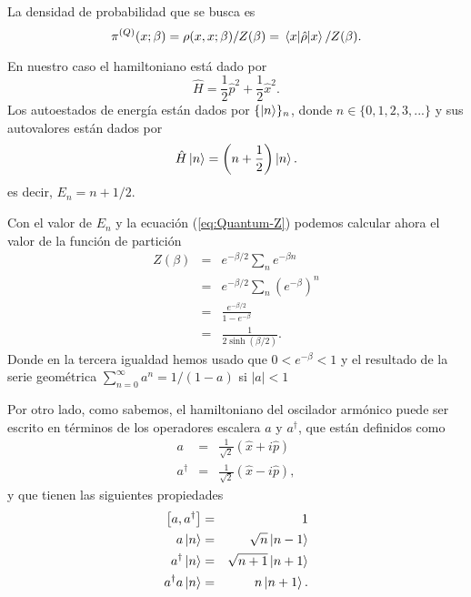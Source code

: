 \documentclass[%
 reprint,
 amsmath,amssymb,
 aps,
 pra,
]{revtex4-2}
\begin{document}
La densidad de probabilidad que se busca es
\begin{equation}
\pi^{(Q)}(x;\beta) = \rho(x,x;\beta)/Z(\beta) = \ev{\hat{\rho}}{x}/Z(\beta). \label{eq:Quantum-pi}
\end{equation}

En nuestro caso el hamiltoniano está dado por
\begin{equation}
\hat{H} = \frac{1}{2} \hat{p}^2 + \frac{1}{2} \hat{x}^2. \label{eq:Quantum-Hamiltonian}
\end{equation}
Los autoestados de energía están dados por $\{\ket{n}\}_n$, donde $n\in\{0,1,2,3,...\}$ y sus autovalores están dados por 
\begin{equation}
\hat{H}\ket{n} = \left(n+\frac{1}{2}\right)\ket{n}.
\end{equation}
es decir, $E_n = n+1/2$.

Con el valor de $E_n$ y la ecuación (\ref{eq:Quantum-Z}) podemos calcular ahora el valor de la función de partición
\begin{eqnarray}
Z(\beta) 	&=& e^{-\beta/2}\sum_n e^{-\beta n}    \nonumber\\
			&=&  e^{-\beta/2}\sum_n \left( e^{-\beta } \right)^n  \nonumber\\
			&=&  \frac{e^{-\beta/2}}{1 - e^{-\beta}} \nonumber \\
			&=& \frac{1}{2\sinh(\beta/2)}.
\end{eqnarray}
Donde en la tercera igualdad hemos usado que $0<e^{-\beta}<1$ y el resultado de la serie geométrica $\sum_{n=0}^\infty a^n = 1/(1-a)$ si $|a|<1$

Por otro lado, como sabemos, el hamiltoniano del oscilador armónico puede ser escrito en términos de los operadores escalera $a$ y $a^\dag$, que están definidos como
\begin{eqnarray}
a &=& \frac{1}{\sqrt{2}}\left(\hat{x}+i\hat{p}\right) \label{eq:ladder-down}\\ 
a^\dag &=& \frac{1}{\sqrt{2}}\left(\hat{x}-i\hat{p}\right) \label{eq:ladder-up},
\end{eqnarray}
y que tienen las siguientes propiedades
\begin{eqnarray}
\left[ a, a^\dag \right] 	&=& 1 \\
							a\ket{n} &=& \sqrt{n}\ket{n-1} \label{eq:ladder-down-on-ket}\\
							a^\dag\ket{n} &=& \sqrt{n+1}\ket{n+1}\\
							a^\dag a\ket{n} &=& n\ket{n+1} \label{eq:number-on-ket}. 
\end{eqnarray}
\end{document}
